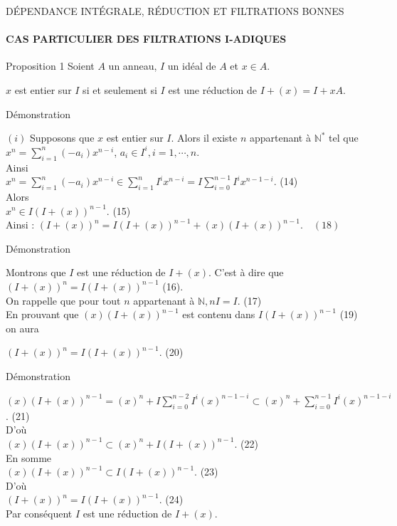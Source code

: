 \documentclass[11pt,a4paper]{beamer}
\begin{document}
		\begin{frame}{DÉPENDANCE INTÉGRALE, RÉDUCTION ET FILTRATIONS BONNES}
		\framesubtitle{CAS PARTICULIER DES FILTRATIONS I-ADIQUES}
		\begin{block}{Proposition 1}
				Soient $A$ un anneau, $I$ un idéal de $A$ et $x \in A$.
				\begin{center}
					$x$ est entier sur $I$ si et seulement si $I$ est une réduction de $I + (x) = I +xA $.
				\end{center}
		\end{block}
	\end{frame}
			\begin{frame}{Démonstration}
		\begin{block}{}
	$(i)$ Supposons que $x$ est entier sur $I$. Alors il existe $n $ appartenant à $ \mathbb{N^*}$ tel que \\ $x^n = \displaystyle \sum_{i=1}^{n}{(-a_i) x^{n-i}}$,  $a_i \in I^i, i=1, \cdots ,n$.\\ Ainsi \\ $x^n = \displaystyle \sum_{i=1}^{n}{(-a_i) x^{n-i}} \in \displaystyle \sum_{i=1}^{n}{I^i x^{n-i}} = I \displaystyle \sum_{i=0}^{n-1}{I^i x^{n-1-i}} $. (14)\\ Alors \\ $ x^n \in I(I+(x))^{n-1}.$ (15)\\
	Ainsi : $(I+(x))^n = I(I+(x))^{n-1} + (x)(I+(x))^{n-1}. \quad (18)$
		\end{block}
	\end{frame}

	
			\begin{frame}{Démonstration}
		\begin{block}{}
			Montrons que $I$ est une réduction de $I + (x)$. C'est à dire que $(I+(x))^{n} = I(I+(x))^{n-1}$ (16).\\ On rappelle que pour tout $n $ appartenant à $ \mathbb{N}, nI = I.$ (17)\\
			En prouvant que $(x)(I+(x))^{n-1} $ est contenu dans $ I(I+(x))^{n-1}$ (19) on aura
			\begin{center}
				$(I+(x))^n = I(I+(x))^{n-1}$. (20)
			\end{center}
		\end{block}
	\end{frame}
	\begin{frame}{Démonstration}
		\begin{block}{}
			$(x)(I+(x))^{n-1} = (x)^n + I\displaystyle \sum_{i=0}^{n-2}{I^i (x)^{n-1-i}} \subset (x)^n + \displaystyle \sum_{i=0}^{n-1}{I^i (x)^{n-1-i}}$. (21)\\
			D'où \\$(x)(I+(x))^{n-1} \subset (x)^n + I(I+(x))^{n-1}.$ (22)\\
			En somme \\$(x)(I+(x))^{n-1} \subset I(I+(x))^{n-1}.$ (23) \\ D'où \\$ (I+(x))^{n} = I(I+(x))^{n-1}$. (24)\\
			Par conséquent $I$ est une réduction de $I + (x)$.
		\end{block}
	\end{frame}
	
\end{document}
